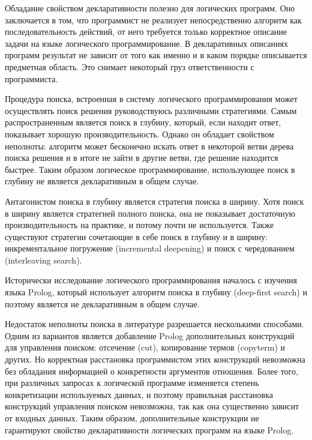 Обладание свойством декларативности полезно для логических программ. Оно заключается в том, что программист не реализует непосредственно алгоритм как последовательность действий, от него требуется только корректное описание задачи на языке логического программирование. В декларативных описаниях программ результат не зависит от того как именно и в каком порядке описывается предметная область. Это снимает некоторый груз ответственности с программиста.


Процедура поиска, встроенная в систему логического программирования может осуществлять поиск решения руководствуюсь различными стратегиями. Самым распространенным является поиск в глубину, который, если находит ответ, показывает хорошую производительность. Однако он обладает свойством неполноты: алгоритм может бесконечно искать ответ в некоторой ветви дерева поиска решения и в итоге не зайти в другие ветви, где решение находится быстрее.
 Таким образом логическое программирование, использующее поиск в глубину не является декларативным в общем случае. 
 
Антагонистом поиска в глубину является стратегия поиска в ширину. Хотя поиск в ширину является стратегией полного поиска, она не показывает достаточную производительность на практике, и потому почти не используется. Также существуют стратегии сочетающие в себе поиск в глубину и в ширину: инкрементальное погружение (incremental deepening) и поиск с чередованием (interleaving search).

Исторически исследование логического программирования началось с изучения языка Prolog, который использует алгоритм поиска в глубину (deep-first search) и поэтому является не декларативным в общем случае. 

Недостаток неполноты поиска в литературе разрешается несколькими способами. Одним из вариантов является добавление Prolog дополнительных конструкций для управления поиском: отсечение (cut), копирование термов (copyterm) и других. Но корректная расстановка программистом этих конструкций невозможна без обладания информацией о конкретности аргументов отношения. Более того, при различных запросах к логической программе изменяется степень конкретизации используемых данных, и поэтому правильная расстановка конструкций управления поиском невозможна, так как она существенно зависит от входных данных. Таким образом, дополнительные конструкции не гарантируют свойство декларативности логических программ на языке Prolog.

